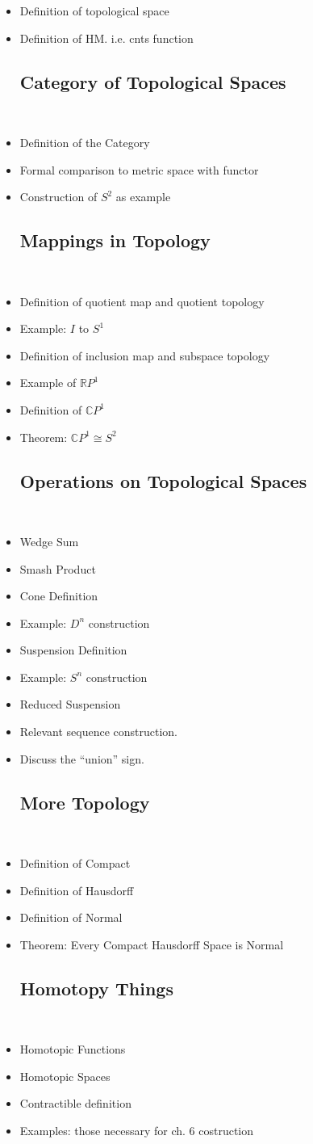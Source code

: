 \documentclass[12]{amsart}
\newcommand{\iso}{\cong} %
\newcommand{\C}{\mathbb{C}}
\newcommand{\R}{\mathbb{R}}
\newcommand{\itemc}{\item[\checkmark]}
\newcommand{\itemo}{\item[$\circ$]}
\begin{document}
\begin{itemize}
\subsection{Basic Definitions}~
    \itemc Definition of topological space
    \itemc Definition of HM. i.e. cnts function
\subsection{Category of Topological Spaces}~
	\itemc Definition of the Category
	\itemc Formal comparison to metric space with functor
	\itemc Construction of $S^2$ as example	
\subsection{Mappings in Topology}~
	\itemc Definition of quotient map and quotient topology
	\itemo Example: $I$ to $S^1$
	\itemc Definition of inclusion map and subspace topology
	\itemo Example of $\R P^1$
	\item Definition of $\C P^1$
	\item Theorem: $\C P^1 \iso S^2$
\subsection{Operations on Topological Spaces}~
	\item Wedge Sum
    \item Smash Product
    \item Cone Definition
    \item Example: $D^n$ construction
    \item Suspension Definition
    \item Example: $S^n$ construction
    \item Reduced Suspension
    \item Relevant sequence construction.
    \item Discuss the ``union'' sign.
\subsection{More Topology}~
    \itemc Definition of Compact
    \itemc Definition of Hausdorff
    \itemo Definition of Normal
    \itemo Theorem: Every Compact Hausdorff Space is Normal 
\subsection{Homotopy Things}~
	\item Homotopic Functions
	\item Homotopic Spaces
    \item Contractible definition
    \item Examples: those necessary for ch. 6 costruction

\end{itemize}
\end{document}
